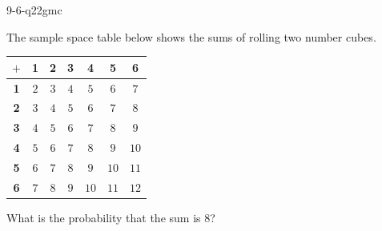 
\begin{practiceQuestion}{9-6-q22}{gmc}
\begin{questionText}
The sample space table below shows the sums of rolling two number cubes.

\begin{center}
\begin{tabular}{c|cccccc}
$+$ & \textbf{1} & \textbf{2} & \textbf{3} & \textbf{4} & \textbf{5} & \textbf{6} \\
\hline
\textbf{1} & $2$ & $3$ & $4$ & $5$ & $6$ & $7$ \\
\textbf{2} & $3$ & $4$ & $5$ & $6$ & $7$ & $8$ \\
\textbf{3} & $4$ & $5$ & $6$ & $7$ & $8$ & $9$ \\
\textbf{4} & $5$ & $6$ & $7$ & $8$ & $9$ & $10$ \\
\textbf{5} & $6$ & $7$ & $8$ & $9$ & $10$ & $11$ \\
\textbf{6} & $7$ & $8$ & $9$ & $10$ & $11$ & $12$ \\
\end{tabular}
\end{center}

What is the probability that the sum is $8$?
\end{questionText}
\end{practiceQuestion}

